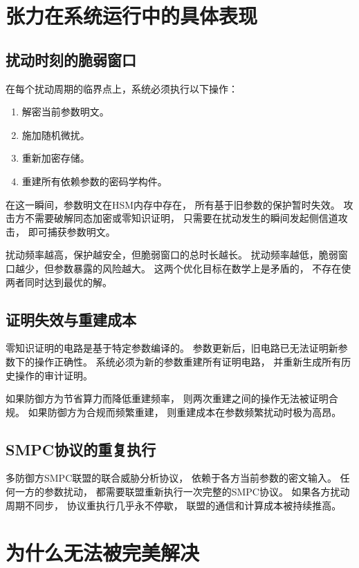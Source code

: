 \documentclass[11pt,a4paper]{article}
\begin{document}
\section{张力在系统运行中的具体表现}

\subsection{扰动时刻的脆弱窗口}

在每个扰动周期的临界点上，系统必须执行以下操作：
\begin{enumerate}[label=(\arabic*)]
    \item 解密当前参数明文。
    \item 施加随机微扰。
    \item 重新加密存储。
    \item 重建所有依赖参数的密码学构件。
\end{enumerate}

在这一瞬间，参数明文在HSM内存中存在，
所有基于旧参数的保护暂时失效。
攻击方不需要破解同态加密或零知识证明，
只需要在扰动发生的瞬间发起侧信道攻击，
即可捕获参数明文。

扰动频率越高，保护越安全，但脆弱窗口的总时长越长。
扰动频率越低，脆弱窗口越少，但参数暴露的风险越大。
这两个优化目标在数学上是矛盾的，
不存在使两者同时达到最优的解。

\subsection{证明失效与重建成本}

零知识证明的电路是基于特定参数编译的。
参数更新后，旧电路已无法证明新参数下的操作正确性。
系统必须为新的参数重建所有证明电路，
并重新生成所有历史操作的审计证明。

如果防御方为节省算力而降低重建频率，
则两次重建之间的操作无法被证明合规。
如果防御方为合规而频繁重建，
则重建成本在参数频繁扰动时极为高昂。

\subsection{SMPC协议的重复执行}

多防御方SMPC联盟的联合威胁分析协议，
依赖于各方当前参数的密文输入。
任何一方的参数扰动，
都需要联盟重新执行一次完整的SMPC协议。
如果各方扰动周期不同步，
协议重执行几乎永不停歇，
联盟的通信和计算成本被持续推高。

\section{为什么无法被完美解决}
\end{document}
